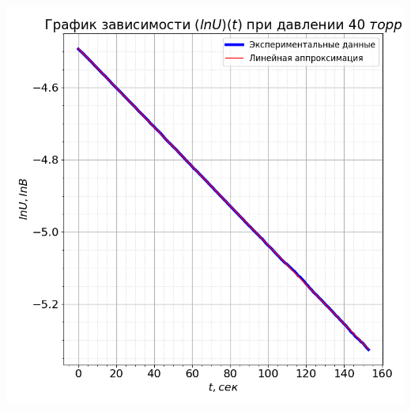 \documentclass[a4paper, 12pt]{article}
\begin{document}
        \begin{minipage}{0.47\textwidth}
            \includegraphics[width=1\linewidth]{graphs/log40.png}
        \end{minipage}
\end{document}
